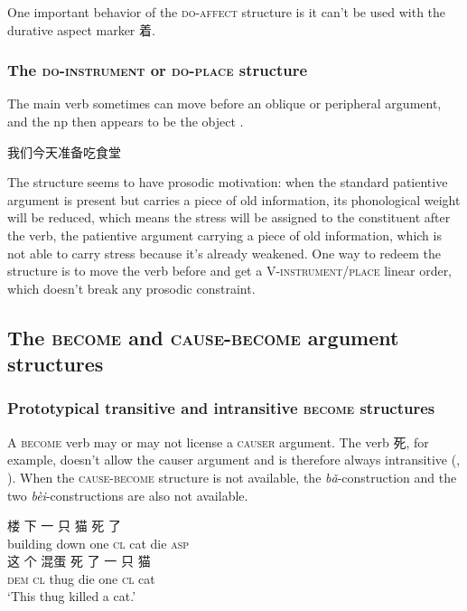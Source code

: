 \documentclass[UTF8, a4paper, oneside, scheme=plain, 12pt]{ctexrep}
\newcommand*{\citesec}[1]{\S~{#1}}
\newcommand*{\citechap}[1]{chap.~{#1}}
\newcommand{\form}[1]{\emph{#1}}
\newcommand{\translate}[1]{`#1'}
\newcommand*{\category}[1]{\textsc{#1}}
\begin{document}
One important behavior of the \category{do}-\category{affect} structure 
is it can't be used with the durative aspect marker 着.

\subsubsection{The \category{do}-\category{instrument} or \category{do}-\category{place} structure}

The main verb sometimes can move before an oblique or peripheral argument, 
and the \acs{np} then appears to be the object
\citep[\citechap{4}, \citesec{5}]{feng2000}.

\begin{exe}
    \ex 我们今天准备吃食堂
\end{exe}

The structure seems to have prosodic motivation:
when the standard patientive argument is present 
but carries a piece of old information,
its phonological weight will be reduced,
which means the stress will be assigned to the constituent after the verb,
the patientive argument carrying a piece of old information,
which is not able to carry stress because it's already weakened.
One way to redeem the structure 
is to move the verb before 
and get a V-\category{instrument/place} linear order, 
which doesn't break any prosodic constraint.

\subsection{The \category{become} and \category{cause}-\category{become} argument structures}

\subsubsection{Prototypical transitive and intransitive \category{become} structures}
\label{sec:verb-phrase.cause-become.ordinary}

A \category{become} verb may or may not license a \category{causer} argument.
The verb 死, for example, doesn't allow the causer argument
and is therefore always intransitive
(,
).
When the \category{cause}-\category{become} structure is not available,
the \form{bǎ}-construction 
and the two \form{bèi}-constructions 
are also not available.

\begin{exe}
    \ex\label{ex:verb-phrase.cause-become.ordinary.1} \gll 楼 下 一 只 猫 死 了  \\
    building down one \category{cl} cat die \category{asp} \\ 
    \ex\label{ex:verb-phrase.cause-become.ordinary.1-no-transitive} \gll * 这 个 混蛋 死 了 一 只 猫 \\
    {} \category{dem} \category{cl} thug die one \category{cl} cat \\ 
    \translate{This thug killed a cat.} 
\end{exe}
\end{document}
